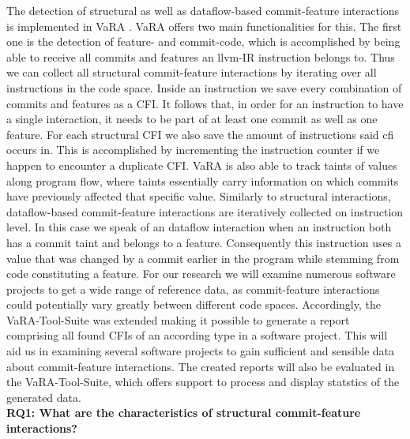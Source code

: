 The detection of structural as well as dataflow-based commit-feature interactions is implemented in VaRA \cite{VaRA2023}.
VaRA offers two main functionalities for this. 
The first one is the detection of feature- and commit-code, which is accomplished by being able to receive all commits and features an llvm-IR instruction belongs to.
Thus we can collect all structural commit-feature interactions by iterating over all instructions in the code space.
Inside an instruction we save every combination of commits and features as a CFI.
It follows that, in order for an instruction to have a single interaction, it needs to be part of at least one commit as well as one feature.
For each structural CFI we also save the amount of instructions said cfi occurs in. 
This is accomplished by incrementing the instruction counter if we happen to encounter a duplicate CFI. 
VaRA is also able to track taints of values along program flow, where taints essentially carry information on which commits have previously affected that specific value.
Similarly to structural interactions, dataflow-based commit-feature interactions are iteratively collected on instruction level.
In this case we speak of an dataflow interaction when an instruction both has a commit taint and belongs to a feature.
Consequently this instruction uses a value that was changed by a commit earlier in the program while stemming from code constituting a feature.
For our research we will examine numerous software projects to get a wide range of reference data, as commit-feature interactions could potentially vary greatly between different code spaces.
Accordingly, the VaRA-Tool-Suite was extended making it possible to generate a report comprising all found CFIs of an according type in a software project.
This will aid us in examining several software projects to gain sufficient and sensible data about commit-feature interactions.
The created reports will also be evaluated in the VaRA-Tool-Suite, which offers support to process and display statstics of the generated data. \\

\textbf{RQ1: What are the characteristics of structural commit-feature interactions?}

